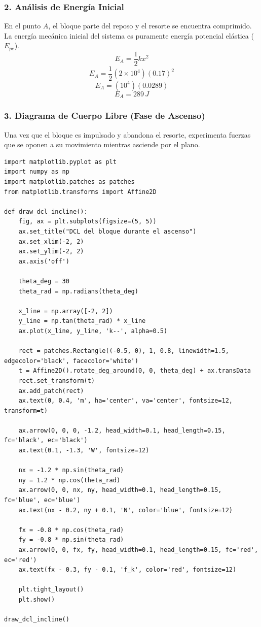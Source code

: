 \documentclass[12pt, a4paper]{article}
\begin{document}
\subsubsection*{2. Análisis de Energía Inicial}
En el punto $A$, el bloque parte del reposo y el resorte se encuentra comprimido. La energía mecánica inicial del sistema es puramente energía potencial elástica ($E_{pe}$).
$$ E_A = \frac{1}{2} k x^2 $$
$$ E_A = \frac{1}{2} (2 \times 10^4) (0.17)^2 $$
$$ E_A = (10^4) (0.0289) $$
$$ E_A = 289 \, \si{J} $$

\subsubsection*{3. Diagrama de Cuerpo Libre (Fase de Ascenso)}
Una vez que el bloque es impulsado y abandona el resorte, experimenta fuerzas que se oponen a su movimiento mientras asciende por el plano.

\begin{lstlisting}
import matplotlib.pyplot as plt
import numpy as np
import matplotlib.patches as patches
from matplotlib.transforms import Affine2D

def draw_dcl_incline():
    fig, ax = plt.subplots(figsize=(5, 5))
    ax.set_title("DCL del bloque durante el ascenso")
    ax.set_xlim(-2, 2)
    ax.set_ylim(-2, 2)
    ax.axis('off')

    theta_deg = 30
    theta_rad = np.radians(theta_deg)

    x_line = np.array([-2, 2])
    y_line = np.tan(theta_rad) * x_line
    ax.plot(x_line, y_line, 'k--', alpha=0.5)

    rect = patches.Rectangle((-0.5, 0), 1, 0.8, linewidth=1.5, edgecolor='black', facecolor='white')
    t = Affine2D().rotate_deg_around(0, 0, theta_deg) + ax.transData
    rect.set_transform(t)
    ax.add_patch(rect)
    ax.text(0, 0.4, 'm', ha='center', va='center', fontsize=12, transform=t)

    ax.arrow(0, 0, 0, -1.2, head_width=0.1, head_length=0.15, fc='black', ec='black')
    ax.text(0.1, -1.3, 'W', fontsize=12)

    nx = -1.2 * np.sin(theta_rad)
    ny = 1.2 * np.cos(theta_rad)
    ax.arrow(0, 0, nx, ny, head_width=0.1, head_length=0.15, fc='blue', ec='blue')
    ax.text(nx - 0.2, ny + 0.1, 'N', color='blue', fontsize=12)

    fx = -0.8 * np.cos(theta_rad)
    fy = -0.8 * np.sin(theta_rad)
    ax.arrow(0, 0, fx, fy, head_width=0.1, head_length=0.15, fc='red', ec='red')
    ax.text(fx - 0.3, fy - 0.1, 'f_k', color='red', fontsize=12)

    plt.tight_layout()
    plt.show()

draw_dcl_incline()
\end{lstlisting}
\end{document}
